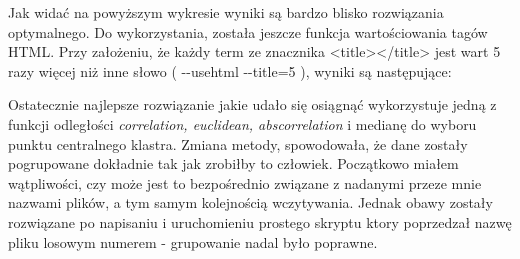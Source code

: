 \documentclass{article}
\begin{document}
\begin{center}
\end{center}

Jak widać na powyższym wykresie wyniki są bardzo blisko rozwiązania optymalnego. Do wykorzystania, została jeszcze funkcja wartościowania tagów HTML. Przy założeniu, że każdy term ze znacznika <title></title> jest wart 5 razy więcej niż inne słowo ( -{}-usehtml -{}-title=5 ), wyniki są następujące:

\begin{center}
\end{center}

Ostatecznie najlepsze rozwiązanie jakie udało się osiągnąć wykorzystuje jedną z funkcji odległości \emph{correlation, euclidean, abscorrelation} i medianę do wyboru punktu centralnego klastra. Zmiana metody, spowodowała, że dane zostały pogrupowane dokładnie tak jak zrobiłby to człowiek. Początkowo miałem wątpliwości, czy może jest to bezpośrednio związane z nadanymi przeze mnie nazwami plików, a tym samym kolejnością wczytywania. Jednak obawy zostały rozwiązane po napisaniu i uruchomieniu prostego skryptu ktory poprzedzał nazwę pliku losowym numerem - grupowanie nadal było poprawne.
\end{document}
